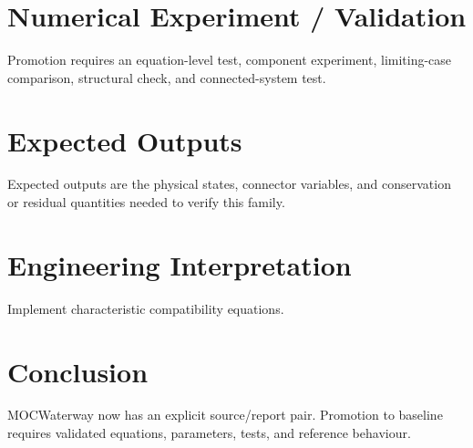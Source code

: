\documentclass[10pt,a4paper]{article}
\begin{document}
\section{Numerical Experiment / Validation}Promotion requires an equation-level test, component experiment, limiting-case comparison, structural check, and connected-system test.
\section{Expected Outputs}Expected outputs are the physical states, connector variables, and conservation or residual quantities needed to verify this family.
\section{Engineering Interpretation}Implement characteristic compatibility equations.
\section*{Conclusion}MOCWaterway now has an explicit source/report pair. Promotion to baseline requires validated equations, parameters, tests, and reference behaviour.
\end{document}
